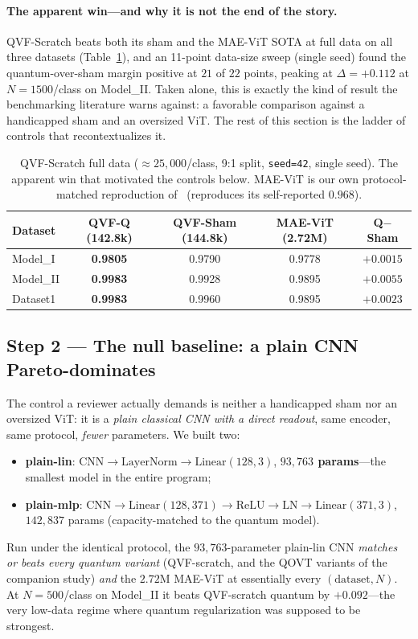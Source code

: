 \documentclass[10pt,letterpaper]{article}
\theoremstyle{plain}
\theoremstyle{definition}
\newcommand{\win}[1]{\textcolor{good}{\textbf{#1}}}
\begin{document}
\paragraph{The apparent win---and why it is not the end of the story.}
QVF-Scratch beats both its sham and the MAE-ViT SOTA at full data on all three
datasets (Table~\ref{tab:scratch-full}), and an 11-point data-size sweep
(single seed) found the quantum-over-sham margin positive at $21$ of $22$ points,
peaking at $\Delta{=}{+}0.112$ at $N{=}1500$/class on Model\_II. Taken alone, this is exactly
the kind of result the benchmarking literature warns against: a favorable
comparison against a handicapped sham and an oversized ViT. The rest of this
section is the ladder of controls that recontextualizes it.

\begin{table}[h!]
\centering
\caption{QVF-Scratch full data ($\approx 25{,}000$/class, 9:1 split,
\texttt{seed=42}, single seed). The apparent win that motivated the controls
below. MAE-ViT is our own protocol-matched reproduction of~\cite{prasha2025masked}
(reproduces its self-reported $0.968$).}
\label{tab:scratch-full}
\begin{tabular}{@{}lcccc@{}}
\toprule
Dataset & QVF-Q (142.8k) & QVF-Sham (144.8k) & MAE-ViT (2.72M) & Q$-$Sham \\
\midrule
Model\_I  & \win{0.9805} & 0.9790 & 0.9778 & $+0.0015$ \\
Model\_II & \win{0.9983} & 0.9928 & 0.9895 & $+0.0055$ \\
Dataset1  & \win{0.9983} & 0.9960 & 0.9895 & $+0.0023$ \\
\bottomrule
\end{tabular}
\end{table}

\subsection{Step 2 --- The null baseline: a plain CNN Pareto-dominates}
\label{sec:tax}

The control a reviewer actually demands is neither a handicapped sham nor an
oversized ViT: it is a \emph{plain classical CNN with a direct readout}, same
encoder, same protocol, \emph{fewer} parameters. We built two:
\begin{itemize}
  \item \textbf{plain-lin}: $\mathrm{CNN}\to\mathrm{LayerNorm}\to\mathrm{Linear}(128,3)$,
        \textbf{$93{,}763$ params}---the smallest model in the entire program;
  \item \textbf{plain-mlp}: $\mathrm{CNN}\to\mathrm{Linear}(128,371)\to\mathrm{ReLU}
        \to\mathrm{LN}\to\mathrm{Linear}(371,3)$, $142{,}837$ params
        (capacity-matched to the quantum model).
\end{itemize}
Run under the identical protocol, the $93{,}763$-parameter plain-lin CNN
\emph{matches or beats every quantum variant} (QVF-scratch, and the QOVT variants
of the companion study) \emph{and} the $2.72\mathrm{M}$ MAE-ViT at essentially
every $(\text{dataset}, N)$. At $N{=}500$/class on Model\_II it beats QVF-scratch
quantum by $+0.092$---the very low-data regime where quantum regularization was
supposed to be strongest.
\end{document}

